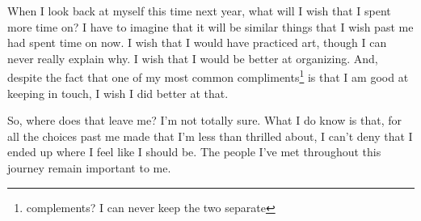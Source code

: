 \documentclass[12pt]{article}[titlepage]
\renewcommand{\,}{\textsuperscript{,}}
\begin{document}
When I look back at myself this time next year, what will I wish that I spent more time on?
I have to imagine that it will be similar things that I wish past me had spent time on now.
I wish that I would have practiced art, though I can never really explain why.
I wish that I would be better at organizing.
And, despite the fact that one of my most common compliments\footnote{complements? I can never keep the two separate} is that I am good at keeping in touch, I wish I did better at that.

So, where does that leave me?
I'm not totally sure.
What I do know is that, for all the choices past me made that I'm less than thrilled about, I can't deny that I ended up where I feel like I should be.
The people I've met throughout this journey remain important to me.
\end{document}
